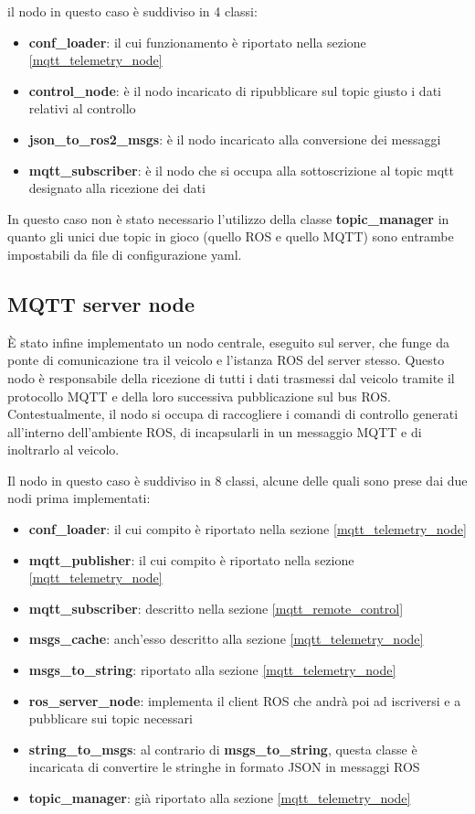 \noindent il nodo in questo caso è suddiviso in 4 classi: 

\begin{itemize}
  \item \textbf{conf\_loader}: il cui funzionamento è riportato nella sezione \ref{mqtt_telemetry_node}
  \item \textbf{control\_node}: è il nodo incaricato di ripubblicare sul topic giusto i dati relativi al controllo
  \item \textbf{json\_to\_ros2\_msgs}: è il nodo incaricato alla conversione dei messaggi
  \item \textbf{mqtt\_subscriber}: è il nodo che si occupa alla sottoscrizione al topic mqtt designato alla ricezione dei dati
\end{itemize}

\noindent In questo caso non è stato necessario l'utilizzo della classe \textbf{topic\_manager} in quanto gli unici due topic in gioco (quello ROS e quello MQTT) sono entrambe impostabili da file di configurazione yaml.

\subsection{MQTT server node}
È stato infine implementato un nodo centrale, eseguito sul server, che funge da ponte di comunicazione tra il veicolo e l'istanza ROS del server stesso. Questo nodo è responsabile della ricezione di tutti i dati trasmessi dal veicolo tramite il protocollo MQTT e della loro successiva pubblicazione sul bus ROS. Contestualmente, il nodo si occupa di raccogliere i comandi di controllo generati all'interno dell'ambiente ROS, di incapsularli in un messaggio MQTT e di inoltrarlo al veicolo.

\noindent Il nodo in questo caso è suddiviso in 8 classi, alcune delle quali sono prese dai due nodi prima implementati:

\begin{itemize}
  \item \textbf{conf\_loader}: il cui compito è riportato nella sezione \ref{mqtt_telemetry_node}
  \item \textbf{mqtt\_publisher}: il cui compito è riportato nella sezione \ref{mqtt_telemetry_node}
  \item \textbf{mqtt\_subscriber}: descritto nella sezione \ref{mqtt_remote_control}
  \item \textbf{msgs\_cache}: anch'esso descritto alla sezione \ref{mqtt_telemetry_node}
  \item \textbf{msgs\_to\_string}: riportato alla sezione \ref{mqtt_telemetry_node}
  \item \textbf{ros\_server\_node}: implementa il client ROS che andrà poi ad iscriversi e a pubblicare sui topic necessari
  \item \textbf{string\_to\_msgs}: al contrario di \textbf{msgs\_to\_string}, questa classe è incaricata di convertire le stringhe in formato JSON in messaggi ROS
  \item \textbf{topic\_manager}: già riportato alla sezione \ref{mqtt_telemetry_node}
\end{itemize}


